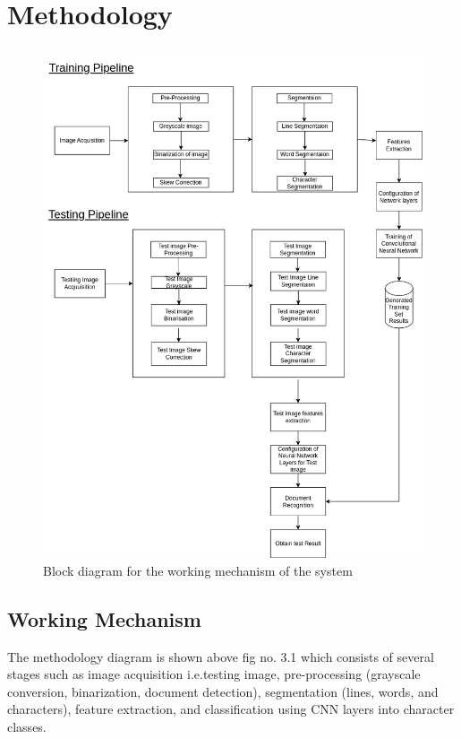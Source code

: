 \chapter{Methodology}
\section*{}
\begin{figure}[h]
    \centering
        \includegraphics[scale=0.46]{images/Methodology.png}
        \caption{Block diagram for the working mechanism of the system}%
    \end{figure}
\newpage
\section{Working Mechanism}
The methodology diagram is shown above fig no. 3.1 which consists of several stages such as image acquisition i.e.testing image, pre-processing (grayscale conversion, binarization, document detection), segmentation (lines, words, and characters), feature extraction, and classification using CNN layers into\cite{Ishfar2020DocumentDetection} character classes.
